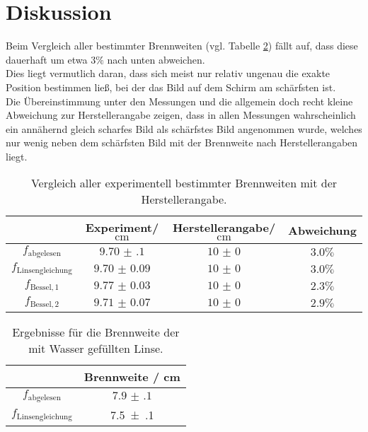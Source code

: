 \FloatBarrier
\section{Diskussion}
\label{sec:Diskussion}
Beim Vergleich aller bestimmter Brennweiten (vgl. Tabelle \ref{tab:diskus}) fällt auf, dass diese dauerhaft um etwa $3\%$ nach unten abweichen.
\\Dies liegt vermutlich daran, dass sich meist nur relativ ungenau die exakte Position bestimmen ließ, bei der das Bild auf dem Schirm am schärfsten ist.
\\Die Übereinstimmung unter den Messungen und die allgemein doch recht kleine Abweichung zur Herstellerangabe zeigen, dass in allen Messungen wahrscheinlich ein annähernd gleich scharfes Bild als schärfstes Bild angenommen wurde, welches nur wenig neben dem schärfsten Bild mit der Brennweite nach Herstellerangaben liegt.

\begin{table}
  \centering
  \caption{Vergleich aller experimentell bestimmter Brennweiten mit der Herstellerangabe.}
  \label{tab:diskus}
  \begin{tabular}{cccc}
    \toprule
    &Experiment/$\si{\centi\meter}$&Herstellerangabe/$\si{\centi\meter}$&Abweichung\\
    \midrule
    $f_{\mathrm{abgelesen}}$&$\num{9.70(10)}$&$\num{10(0)}$&$3.0\%$\\
    $f_{\mathrm{Linsengleichung}}$&$\num{9.70(9)}$&$\num{10(0)}$&$3.0\%$\\
    $f_\mathrm{Bessel, 1}$&$\num{9.77(3)}$&$\num{10(0)}$&$2.3\%$\\
    $f_\mathrm{Bessel, 2}$&$\num{9.71(7)}$&$\num{10(0)}$&$2.9\%$\\
\bottomrule
\end{tabular}
\end{table}

\begin{table}
  \centering
  \caption{Ergebnisse für die Brennweite der mit Wasser gefüllten Linse.}
  \label{tab:diskus}
  \begin{tabular}{cc}
    \toprule
	  & Brennweite / \si{\centi\meter} \\
    \midrule
    $f_{\mathrm{abgelesen}}$&$\num{7.9(1)}$ \\
	  $f_{\mathrm{Linsengleichung}}$ & \num{7.5(1)} \\
\bottomrule
\end{tabular}
\end{table}


